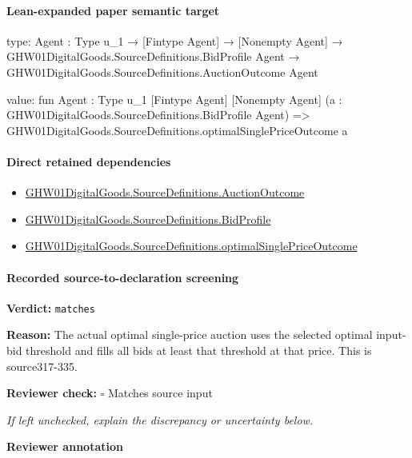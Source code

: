 \documentclass[10pt]{article}
\newcommand{\reviewerbox}{%
  \par\noindent\fbox{\parbox{0.96\linewidth}{\rule{0pt}{0.38in}}}\par
}
\newcommand{\reviewmatch}[1]{%
  \par\noindent\textbf{Reviewer check:} $\square$\; #1\par
  \noindent\emph{If left unchecked, explain the discrepancy or uncertainty below.}\par
}
\begin{document}
\paragraph{Lean-expanded paper semantic target}
\begin{ReviewVerbatim}
type:
{Agent : Type u_1} →
  [Fintype Agent] →
    [Nonempty Agent] →
      GHW01DigitalGoods.SourceDefinitions.BidProfile Agent → GHW01DigitalGoods.SourceDefinitions.AuctionOutcome Agent

value:
fun {Agent : Type u_1} [Fintype Agent] [Nonempty Agent] (a : GHW01DigitalGoods.SourceDefinitions.BidProfile Agent) =>
  GHW01DigitalGoods.SourceDefinitions.optimalSinglePriceOutcome a
\end{ReviewVerbatim}

\paragraph{Direct retained dependencies}
\begin{itemize}\raggedright
\item \hyperlink{paper-prerequisite-fc173e8d557afd08}{GHW01\allowbreak{}Digital\allowbreak{}Goods.\allowbreak{}Source\allowbreak{}Definitions.\allowbreak{}Auction\allowbreak{}Outcome}
\item \hyperlink{paper-prerequisite-ac8769d0dccf04f4}{GHW01\allowbreak{}Digital\allowbreak{}Goods.\allowbreak{}Source\allowbreak{}Definitions.\allowbreak{}Bid\allowbreak{}Profile}
\item \hyperlink{governing-declaration-b89642baef408270}{GHW01\allowbreak{}Digital\allowbreak{}Goods.\allowbreak{}Source\allowbreak{}Definitions.\allowbreak{}optimal\allowbreak{}Single\allowbreak{}Price\allowbreak{}Outcome}
\end{itemize}
\paragraph{Recorded source-to-declaration screening}
\textbf{Verdict:} \texttt{matches}
\\
{\raggedright
\textbf{Reason:} The actual optimal single-\allowbreak{}price auction uses the selected optimal input-\allowbreak{}bid threshold and fills all bids at least that threshold at that price.\allowbreak{} This is source317-\allowbreak{}335.\allowbreak{}
\par}
\reviewmatch{Matches source input}
\noindent\textbf{Reviewer annotation}\par
\reviewerbox
\clearpage
\hypertarget{paper-prerequisite-820d7331e38231bb}{}
\end{document}
